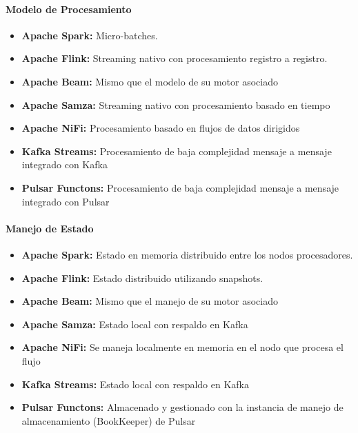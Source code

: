 \paragraph{Modelo de Procesamiento}
\begin{itemize}
    \item \textbf{Apache Spark:} Micro-batches.
    \item \textbf{Apache Flink:} Streaming nativo con procesamiento registro a registro.
    \item \textbf{Apache Beam:} Mismo que el modelo de su motor asociado 
    \item \textbf{Apache Samza:} Streaming nativo con procesamiento basado en tiempo
    \item \textbf{Apache NiFi:} Procesamiento basado en flujos de datos dirigidos
    \item \textbf{Kafka Streams:} Procesamiento de baja complejidad mensaje a mensaje integrado con Kafka
    \item \textbf{Pulsar Functons:} Procesamiento de baja complejidad mensaje a mensaje integrado con Pulsar
\end{itemize}

\paragraph{Manejo de Estado}
\begin{itemize}
    \item \textbf{Apache Spark:} Estado en memoria distribuido entre los nodos procesadores.
    \item \textbf{Apache Flink:} Estado distribuido utilizando snapshots.
    \item \textbf{Apache Beam:} Mismo que el manejo de su motor asociado 
    \item \textbf{Apache Samza:} Estado local con respaldo en Kafka
    \item \textbf{Apache NiFi:} Se maneja localmente en memoria en el nodo que procesa el flujo
    \item \textbf{Kafka Streams:} Estado local con respaldo en Kafka
    \item \textbf{Pulsar Functons:} Almacenado y gestionado con la instancia de manejo de almacenamiento (BookKeeper) de Pulsar
\end{itemize}


